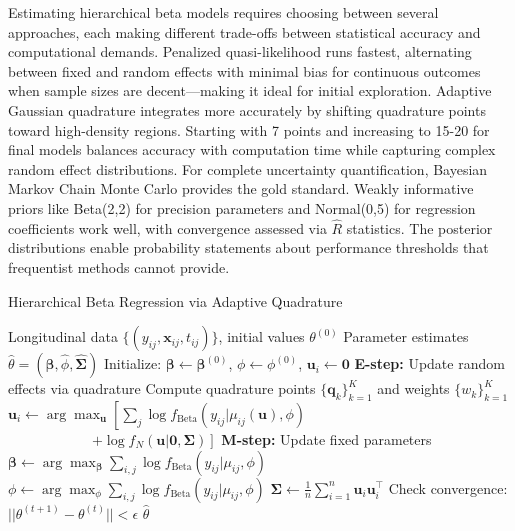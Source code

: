 \documentclass[10pt,journal,compsoc]{IEEEtran}
\begin{document}
Estimating hierarchical beta models requires choosing between several approaches, each making different trade-offs between statistical accuracy and computational demands. Penalized quasi-likelihood runs fastest, alternating between fixed and random effects with minimal bias for continuous outcomes when sample sizes are decent---making it ideal for initial exploration. Adaptive Gaussian quadrature integrates more accurately by shifting quadrature points toward high-density regions. Starting with 7 points and increasing to 15-20 for final models balances accuracy with computation time while capturing complex random effect distributions. For complete uncertainty quantification, Bayesian Markov Chain Monte Carlo provides the gold standard. Weakly informative priors like Beta(2,2) for precision parameters and Normal(0,5) for regression coefficients work well, with convergence assessed via $\hat{R}$ statistics. The posterior distributions enable probability statements about performance thresholds that frequentist methods cannot provide.

\begin{algorithm}
\caption{Hierarchical Beta Regression via Adaptive Quadrature}
\begin{algorithmic}[1]
\REQUIRE Longitudinal data $\{(y_{ij}, \mathbf{x}_{ij}, t_{ij})\}$, initial values $\theta^{(0)}$
\ENSURE Parameter estimates $\hat{\theta} = (\hat{\boldsymbol{\beta}}, \hat{\phi}, \hat{\mathbf{\Sigma}})$
\STATE Initialize: $\boldsymbol{\beta} \leftarrow \boldsymbol{\beta}^{(0)}$, $\phi \leftarrow \phi^{(0)}$, $\mathbf{u}_i \leftarrow \mathbf{0}$
    \STATE \textbf{E-step:} Update random effects via quadrature
        \STATE Compute quadrature points $\{\mathbf{q}_k\}_{k=1}^K$ and weights $\{w_k\}_{k=1}^K$
        \STATE $\mathbf{u}_i \leftarrow \arg\max_{\mathbf{u}} \left[\sum_j \log f_{\text{Beta}}(y_{ij}|\mu_{ij}(\mathbf{u}), \phi)\right.$ \\
        \STATE $\qquad\qquad\qquad\left. + \log f_N(\mathbf{u}|\mathbf{0}, \mathbf{\Sigma})\right]$
    \ENDFOR
    \STATE \textbf{M-step:} Update fixed parameters
    \STATE $\boldsymbol{\beta} \leftarrow \arg\max_{\boldsymbol{\beta}} \sum_{i,j} \log f_{\text{Beta}}(y_{ij}|\mu_{ij}, \phi)$
    \STATE $\phi \leftarrow \arg\max_{\phi} \sum_{i,j} \log f_{\text{Beta}}(y_{ij}|\mu_{ij}, \phi)$
    \STATE $\mathbf{\Sigma} \leftarrow \frac{1}{n} \sum_{i=1}^n \mathbf{u}_i \mathbf{u}_i^\top$
    \STATE Check convergence: $||\theta^{(t+1)} - \theta^{(t)}|| < \epsilon$
\ENDWHILE
\RETURN $\hat{\theta}$
\end{algorithmic}
\end{algorithm}
\end{document}
